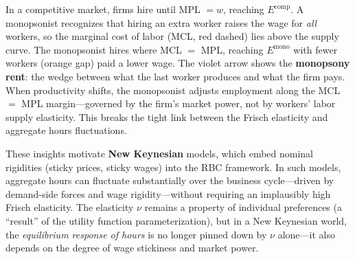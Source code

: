 \begin{itemize}
\begin{center}
    \end{center}
    
    In a competitive market, firms hire until MPL $= w$, reaching $E^{\text{comp}}$. A monopsonist recognizes that hiring an extra worker raises the wage for \textit{all} workers, so the marginal cost of labor (MCL, red dashed) lies above the supply curve. The monopsonist hires where MCL $=$ MPL, reaching $E^{\text{mono}}$ with fewer workers (orange gap) paid a lower wage. The violet arrow shows the \textbf{monopsony rent}: the wedge between what the last worker produces and what the firm pays. When productivity shifts, the monopsonist adjusts employment along the MCL $=$ MPL margin---governed by the firm's market power, not by workers' labor supply elasticity. This breaks the tight link between the Frisch elasticity and aggregate hours fluctuations.
\end{itemize}

These insights motivate \textbf{New Keynesian} models, which embed nominal rigidities (sticky prices, sticky wages) into the RBC framework. In such models, aggregate hours can fluctuate substantially over the business cycle---driven by demand-side forces and wage rigidity---without requiring an implausibly high Frisch elasticity. The elasticity $\nu$ remains a property of individual preferences (a ``result'' of the utility function parameterization), but in a New Keynesian world, the \textit{equilibrium response of hours} is no longer pinned down by $\nu$ alone---it also depends on the degree of wage stickiness and market power.

